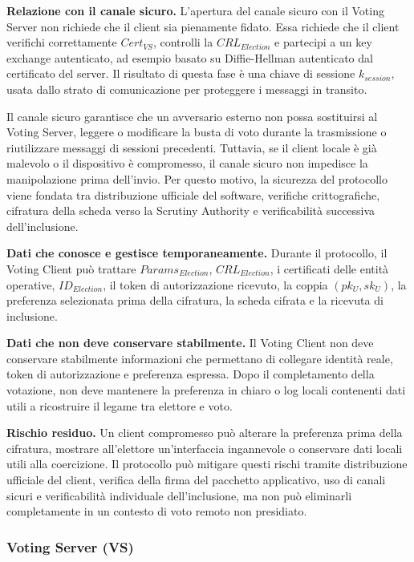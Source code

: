 \documentclass[a4paper,12pt]{article}
\begin{document}
\textbf{Relazione con il canale sicuro.}
L'apertura del canale sicuro con il Voting Server non richiede che il client sia pienamente fidato.
Essa richiede che il client verifichi correttamente \(Cert_{VS}\), controlli la \(CRL_{Election}\) e partecipi a un key exchange autenticato, ad esempio basato su Diffie-Hellman autenticato dal certificato del server.
Il risultato di questa fase \`e una chiave di sessione \(k_{session}\), usata dallo strato di comunicazione per proteggere i messaggi in transito.

Il canale sicuro garantisce che un avversario esterno non possa sostituirsi al Voting Server, leggere o modificare la busta di voto durante la trasmissione o riutilizzare messaggi di sessioni precedenti.
Tuttavia, se il client locale \`e gi\`a malevolo o il dispositivo \`e compromesso, il canale sicuro non impedisce la manipolazione prima dell'invio.
Per questo motivo, la sicurezza del protocollo viene fondata tra distribuzione ufficiale del software, verifiche crittografiche, cifratura della scheda verso la Scrutiny Authority e verificabilit\`a successiva dell'inclusione.

\textbf{Dati che conosce e gestisce temporaneamente.}
Durante il protocollo, il Voting Client pu\`o trattare \(Params_{Election}\), \(CRL_{Election}\), i certificati delle entit\`a operative, \(ID_{Election}\), il token di autorizzazione ricevuto, la coppia \((pk_U, sk_U)\), la preferenza selezionata prima della cifratura, la scheda cifrata e la ricevuta di inclusione.

\textbf{Dati che non deve conservare stabilmente.}
Il Voting Client non deve conservare stabilmente informazioni che permettano di collegare identit\`a reale, token di autorizzazione e preferenza espressa.
Dopo il completamento della votazione, non deve mantenere la preferenza in chiaro o log locali contenenti dati utili a ricostruire il legame tra elettore e voto.

\textbf{Rischio residuo.}
Un client compromesso pu\`o alterare la preferenza prima della cifratura, mostrare all'elettore un'interfaccia ingannevole o conservare dati locali utili alla coercizione.
Il protocollo pu\`o mitigare questi rischi tramite distribuzione ufficiale del client, verifica della firma del pacchetto applicativo, uso di canali sicuri e verificabilit\`a individuale dell'inclusione, ma non pu\`o eliminarli completamente in un contesto di voto remoto non presidiato.

\subsubsection{Voting Server (VS)}
\end{document}
